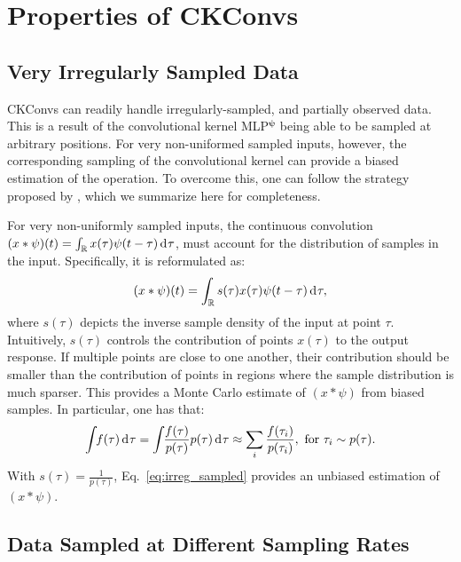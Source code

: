\documentclass{article}
\def\sR{{\mathbb{R}}}
\def\sR{{\mathbb{R}}}
\newcommand{\du}{\mathrm{d}\mkern1mu}
\newcommand{\mlp}{{\btt MLP}}
\begin{document}
\section{Properties of CKConvs}\label{appx:properties}

\subsection{Very Irregularly Sampled Data}\label{appx:irregularly_sampled}
CKConvs can readily handle irregularly-sampled, and partially observed data. This is a result of the convolutional kernel \mlp$^{\boldsymbol{\psi}}$ being able to be sampled at arbitrary positions. For very non-uniformed sampled inputs, however, the corresponding sampling of the convolutional kernel can provide a biased estimation of the operation. To overcome this, one can follow the strategy proposed by \citet{wu2019pointconv}, which we summarize here for completeness.

For very non-uniformly sampled inputs, the continuous convolution $(x * \psi)(t) = \int_{\sR} x(\tau) \psi(t - \tau) \, \du \tau$, must account for the distribution of samples in the input. Specifically, it is reformulated as:
\begin{equation}
\setlength{\abovedisplayskip}{3.5pt}
\setlength{\belowdisplayskip}{3.5pt}
     (x * \psi)(t) = \int_{\sR} s(\tau) x(\tau) \psi(t - \tau) \, \du \tau, \label{eq:irreg_sampled}
\end{equation}
where $s(\tau)$ depicts the inverse sample density of the input at point $\tau$. Intuitively, $s(\tau)$ controls the contribution of points $x(\tau)$ to the output response. If multiple points are close to one another, their contribution should be smaller than the contribution of points in regions where the sample distribution is much sparser. This provides a Monte Carlo estimate of $(x * \psi)$ from biased samples. In particular, one has that:
\begin{equation*}
\setlength{\abovedisplayskip}{-2pt}
\setlength{\belowdisplayskip}{3.5pt}
    \int \hspace{-1mm} f(\tau) \, \du \tau= \int \hspace{-1mm} \frac{f(\tau)}{p(\tau)} p(\tau) \, \du \tau \approx \sum_{i}\frac{f(\tau_i)}{p(\tau_i)}, \ \text{for}\  \tau_{i} \sim p(\tau). 
\end{equation*}
With  $s(\tau) = \tfrac{1}{p(\tau)}$, Eq.~\ref{eq:irreg_sampled} provides an unbiased estimation of $(x * \psi)$.
\subsection{Data Sampled at Different Sampling Rates}\label{appx:diff_sampling_rates}
\end{document}

